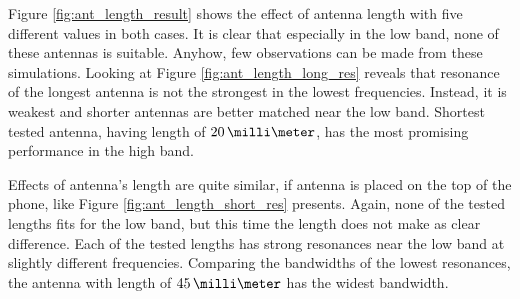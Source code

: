 Figure \ref{fig:ant_length_result} shows the effect of antenna length with five different values in both cases. It is clear that especially in the low band, none of these antennas is suitable. Anyhow, few observations can be made from these simulations. Looking at Figure \ref{fig:ant_length_long_res} reveals that resonance of the longest antenna is not the strongest in the lowest frequencies. Instead, it is weakest and shorter antennas are better matched near the low band. Shortest tested antenna, having length of $20\,\milli\meter$, has the most promising performance in the high band.

Effects of antenna's length are quite similar, if antenna is placed on the top of the phone, like Figure \ref{fig:ant_length_short_res} presents. Again, none of the tested lengths fits for the low band, but this time the length does not make as clear difference. Each of the tested lengths has strong resonances near the low band at slightly different frequencies. Comparing the bandwidths of the lowest resonances, the antenna with length of $45\,\milli\meter$ has the widest bandwidth.

